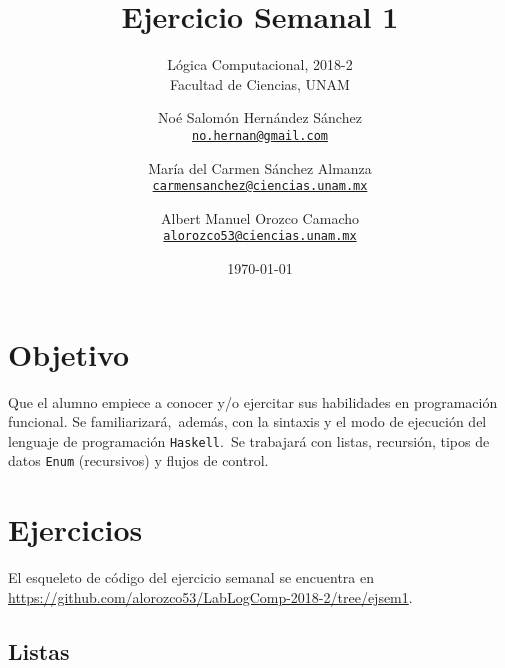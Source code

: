 \documentclass[paper=letter, fontsize=12pt]{scrartcl}
\title{Ejercicio Semanal 1}
\subtitle{
  Lógica Computacional, 2018-2\\
  Facultad de Ciencias, UNAM
}
\author{
  \normalsize
  Noé Salomón Hernández Sánchez\\
  \normalsize
  \texttt{\href{mailto:no.hernan@gmail.com}{no.hernan@gmail.com}}
  \and
  \normalsize
  María del Carmen Sánchez Almanza\\
  \normalsize
  \texttt{\href{mailto:carmensanchez@ciencias.unam.mx}{carmensanchez@ciencias.unam.mx}}
  \and
  \normalsize
  Albert Manuel Orozco Camacho\\
  \normalsize
  \texttt{\href{mailto:alorozco53@ciencias.unam.mx}{alorozco53@ciencias.unam.mx}}
}
\date{\today}
\begin{document}
\maketitle

\section{Objetivo}

\noindent
Que el alumno empiece a conocer y/o ejercitar sus habilidades en programación funcional. Se familiarizará,\
además, con la sintaxis y el modo de ejecución del lenguaje de programación \verb+Haskell+.\
Se trabajará con listas, recursión, tipos de datos \verb+Enum+ (recursivos) y flujos de control.

\section{Ejercicios}

\noindent
El esqueleto de código del ejercicio semanal se encuentra en \url{https://github.com/alorozco53/LabLogComp-2018-2/tree/ejsem1}.

\subsection{Listas}
\end{document}
